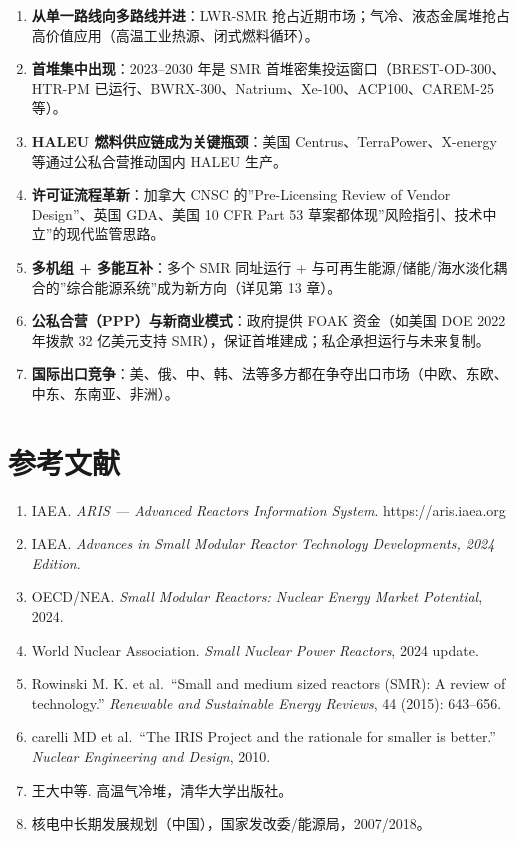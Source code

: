\documentclass[
  UTF8,
  scheme=plain,
  fontsize=10pt,
  openany
]{ctexbook}
\begin{document}
\begin{enumerate}
\def\labelenumi{\arabic{enumi}.}
\tightlist
\item
  \textbf{从单一路线向多路线并进}：LWR-SMR
  抢占近期市场；气冷、液态金属堆抢占高价值应用（高温工业热源、闭式燃料循环）。
\item
  \textbf{首堆集中出现}：2023--2030 年是 SMR
  首堆密集投运窗口（BREST-OD-300、HTR-PM
  已运行、BWRX-300、Natrium、Xe-100、ACP100、CAREM-25 等）。
\item
  \textbf{HALEU 燃料供应链成为关键瓶颈}：美国
  Centrus、TerraPower、X-energy 等通过公私合营推动国内 HALEU 生产。
\item
  \textbf{许可证流程革新}：加拿大 CNSC 的''Pre-Licensing Review of
  Vendor Design''、英国 GDA、美国 10 CFR Part 53
  草案都体现''风险指引、技术中立''的现代监管思路。
\item
  \textbf{多机组 + 多能互补}：多个 SMR 同址运行 +
  与可再生能源/储能/海水淡化耦合的''综合能源系统''成为新方向（详见第 13
  章）。
\item
  \textbf{公私合营（PPP）与新商业模式}：政府提供 FOAK 资金（如美国 DOE
  2022 年拨款 32 亿美元支持
  SMR），保证首堆建成；私企承担运行与未来复制。
\item
  \textbf{国际出口竞争}：美、俄、中、韩、法等多方都在争夺出口市场（中欧、东欧、中东、东南亚、非洲）。
\end{enumerate}

\section{参考文献}\label{ux53c2ux8003ux6587ux732e-1}

\begin{enumerate}
\def\labelenumi{\arabic{enumi}.}
\tightlist
\item
  IAEA. \emph{ARIS --- Advanced Reactors Information System}.
  https://aris.iaea.org
\item
  IAEA. \emph{Advances in Small Modular Reactor Technology Developments,
  2024 Edition}.
\item
  OECD/NEA. \emph{Small Modular Reactors: Nuclear Energy Market
  Potential}, 2024.
\item
  World Nuclear Association. \emph{Small Nuclear Power Reactors}, 2024
  update.
\item
  Rowinski M. K. et al.~``Small and medium sized reactors (SMR): A
  review of technology.'' \emph{Renewable and Sustainable Energy
  Reviews}, 44 (2015): 643--656.
\item
  carelli MD et al.~``The IRIS Project and the rationale for smaller is
  better.'' \emph{Nuclear Engineering and Design}, 2010.
\item
  王大中等. 高温气冷堆，清华大学出版社。
\item
  核电中长期发展规划（中国），国家发改委/能源局，2007/2018。
\end{enumerate}
\end{document}
